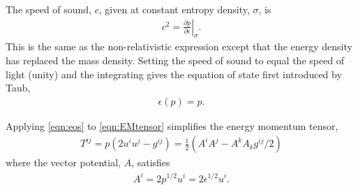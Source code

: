 \documentclass[10pt, fleqn,final,showtrims,oldfontcommands, article,a4paper,oneside]{memoir} %
\newcommand{\eqal}[2]{\begin{align}#1\label{eqn:#2}\end{align}}
\newcommand{\eqnref}[1]{\ref{eqn:#1}}
\newcommand{\epsillon}{\epsilon}
\newcommand{\lr}[1]{\left( #1 \right)}
\renewcommand{\d}{\partial}
\newcommand{\given}[2]{ \left.{#1}\right|_{#2}  }
\newcommand{\half}{\tfrac{1}{2}}
\begin{document}
The speed of sound, $c$,  given at constant entropy density, $\sigma$, is\cite{LandauBook,Taub1978} 
\begin{align}
  c^2 = \given{\frac{\d p}{\d \epsillon}}{\sigma}. \label{eqn:soundspeed}
\end{align}
This is the same as the non-relativistic expression except that the energy density has replaced the mass density.
Setting the speed of sound to equal the speed of light (unity) and the integrating 
 gives
 the equation of state first introduced by Taub\cite{Taub1978},
\eqal{
  \epsilon(p) = p.
}{eos}




Applying \eqnref{eos} to \eqnref{EMtensor} simplifies the energy momentum tensor,
\eqal{
  T^{i j}  = p\lr{2 u^i u^j - g^{i j}} = \half \lr{ A^i A^j - A^k A_k g^{i j}/2} 
}{EMFluid}
where the vector potential, $A$,  satisfies
\eqal{
  A^i = 2p^{1/2}u^i =2 \epsilon^{1/2} u^i.
}{defnA}
\end{document}
